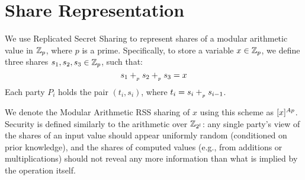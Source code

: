 \section{Share Representation}

We use Replicated Secret Sharing to represent shares of a modular arithmetic value in $\mathbb{Z}_p$, where $p$ is a prime.
Specifically, to store a variable $x \in \mathbb{Z}_p$, we define three shares $s_1, s_2, s_3 \in \mathbb{Z}_p$, such that:
$$s_1 +_{_p} s_2 +_{_p} s_3 = x$$
Each party $P_i$ holds the pair $(t_i, s_i)$, where $t_i = s_i +_{_p} s_{i - 1}$.

We denote the Modular Arithmetic RSS sharing of $x$ using this scheme as $[x]^{Ap}$. 
Security is defined similarly to the arithmetic over $\mathbb{Z}_{2^l}$: any single party's view of the shares of an input value should appear uniformly random (conditioned on prior knowledge), and the shares of computed values (e.g., from additions or multiplications) should not reveal any more information than what is implied by the operation itself.